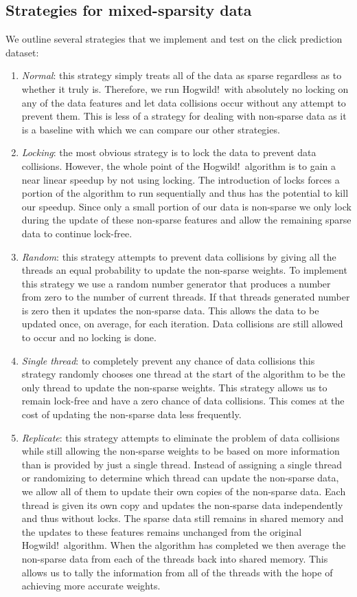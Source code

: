 \documentclass{article} %
\begin{document}
\subsection{Strategies for mixed-sparsity data}
We outline several strategies that we implement and test on the click prediction dataset:
\begin{enumerate}
\item {\em Normal}: this strategy simply treats all of the data as sparse regardless as to whether it truly is.  Therefore, we run Hogwild!~with absolutely no locking on any of the data features and let data collisions occur without any attempt to prevent them. This is less of a strategy for dealing with non-sparse data as it is a baseline with which we can compare our other strategies. 
\item {\em Locking}: the most obvious strategy is to lock the data to prevent data collisions.  However, the whole point of the Hogwild!~algorithm is to gain a near linear speedup by not using locking. The introduction of locks forces a portion of the algorithm to run sequentially and thus has the potential to kill our speedup. Since only a small portion of our data is non-sparse we only lock during the update of these non-sparse features and allow the remaining sparse data to continue lock-free. 
\item {\em Random}: this strategy attempts to prevent data collisions by giving all the threads an equal probability to update the non-sparse weights. To implement this strategy we use a random number generator that produces a number from zero to the number of current threads. If that threads generated number is zero then it updates the non-sparse data. This allows the data to be updated once, on average, for each iteration.  Data collisions are still allowed to occur and no locking is done. 
\item {\em Single thread}: to completely prevent any chance of data collisions this strategy randomly chooses one thread at the start of the algorithm to be the only thread to update the non-sparse weights. This strategy allows us to remain lock-free and have a zero chance of data collisions. This comes at the cost of updating the non-sparse data less frequently.
\item {\em Replicate}: this strategy attempts to eliminate the problem of data collisions while still allowing the non-sparse weights to be based on more information than is provided by just a single thread. Instead of assigning a single thread or randomizing to determine which thread can update the non-sparse data, we allow all of them to update their own copies of the non-sparse data.  Each thread is given its own copy and updates the non-sparse data independently and thus without locks.  The sparse data still remains in shared memory and the updates to these features remains unchanged from the original Hogwild!~algorithm. When the algorithm has completed we then average the non-sparse data from each of the threads back into shared memory. This allows us to tally the information from all of the threads with the hope of achieving more accurate weights. 
\end{enumerate}
\end{document}
